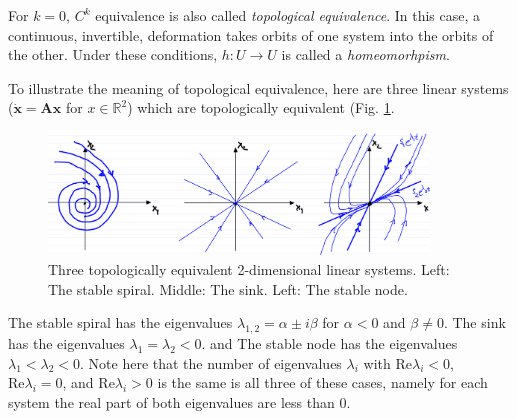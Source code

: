 \begin{definition}
	For $k=0$, $C^{k}$ equivalence is also called \emph{topological equivalence}. In this case, a continuous, invertible, deformation takes orbits of one system into the orbits of the other. Under these conditions,  $h:U\to U$ is called a \emph{homeomorhpism}.
\end{definition}
\begin{ex}[Topologically equivalent linear systems for $n=2$]
	To illustrate the meaning of topological equivalence, here are three linear systems ($\dot{\bm{x} } = \bm{Ax}  $ for $x\in \mathbb{R}^2$) which are topologically equivalent (Fig. \ref{fig:topo_equiv}.
	\begin{figure}[h!]
		\centering
		\includegraphics[width=0.9\textwidth]{figures/ch2/13topo_equiv.png}
		\caption{Three topologically equivalent 2-dimensional linear systems. Left: The stable spiral. Middle: The sink. Left: The stable node.}
		\label{fig:topo_equiv}
	\end{figure}

The stable spiral has the eigenvalues $\lambda _{1,2}= \alpha \pm i \beta $ for $\alpha <0$ and $\beta \neq 0$. The sink has the eigenvalues $\lambda_1=\lambda_2<0$. and The stable node has the eigenvalues $\lambda_1 < \lambda_2 < 0$. Note here that the number of eigenvalues $\lambda_i$ with $ \textrm{Re} \lambda_i <0$, $ \textrm{Re} \lambda _i=0$, and $ \textrm{Re} \lambda _i>0$ is the same is all three of these cases, namely for each system the real part of both eigenvalues are less than 0.	
\end{ex}

